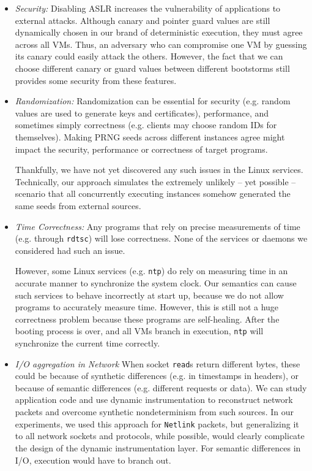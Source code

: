 \begin{itemize}

\item {\em Security:} \newline
Disabling ASLR increases the vulnerability of
applications to external attacks. 
Although canary and pointer guard
values are still dynamically chosen in
our brand of deterministic execution, 
they must agree across all VMs. Thus,
an adversary  who can compromise one VM by
guessing its canary could easily attack the others.
However, the fact that we can choose different
canary or guard values between different bootstorms
still provides some security from these features.

\item {\em Randomization:} \newline
Randomization can be essential for security (e.g. random values
are used to generate keys and certificates),
performance, and sometimes simply correctness (e.g. 
clients may choose random IDs for themselves).
Making PRNG seeds across different instances
agree might impact the security, performance
or correctness of target programs. 

Thankfully, we have not yet discovered any such
issues in the Linux services. Technically,
our approach simulates the extremely unlikely 
-- yet possible -- scenario that all concurrently executing
instances somehow generated the same seeds
from external sources.

\item{\em Time Correctness:} \newline
Any programs that rely on precise
measurements of time (e.g. through \texttt{rdtsc})
will lose correctness. None 
of the services or daemons we considered 
had such an issue.

However, some Linux services (e.g. \texttt{ntp}) 
do rely on measuring time in an accurate 
manner to synchronize the system clock.
Our semantics can cause such services to 
behave incorrectly at start up,
because we do not allow programs to accurately measure time.
However, this is still not a huge correctness problem because these
programs are self-healing. After the booting process is over,
and all VMs branch in execution, \texttt{ntp} will synchronize
the current time correctly.

\item{\em I/O aggregation in Network} \newline
When socket \texttt{read}s return different bytes,
these could be because of synthetic differences (e.g.
in timestamps in headers), or because of 
semantic differences (e.g. different requests or data).
We can study application code and use dynamic instrumentation
to reconstruct network packets and overcome synthetic nondeterminism
from such sources. In our experiments, we used this approach
for \texttt{Netlink} packets, but generalizing it
to all network sockets and protocols, while possible, would clearly
complicate the design of the dynamic instrumentation
layer. For semantic differences in I/O, 
execution would have to branch out.


\end{itemize}

